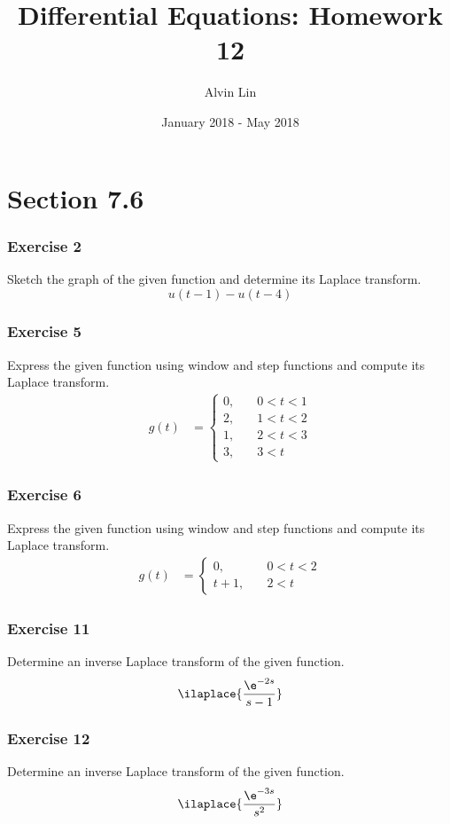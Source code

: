 \documentclass{math}
\title{Differential Equations: Homework 12}
\author{Alvin Lin}
\date{January 2018 - May 2018}
\begin{document}
\maketitle
\clearpage

\section*{Section 7.6}

\subsubsection*{Exercise 2}
Sketch the graph of the given function and determine its Laplace transform.
\[ u(t-1)-u(t-4) \]

\subsubsection*{Exercise 5}
Express the given function using window and step functions and compute its
Laplace transform.
\begin{align*}
  g(t) &= \begin{cases}
    0, &\quad 0<t<1 \\
    2, &\quad 1<t<2 \\
    1, &\quad 2<t<3 \\
    3, &\quad 3<t
  \end{cases}
\end{align*}

\subsubsection*{Exercise 6}
Express the given function using window and step functions and compute its
Laplace transform.
\begin{align*}
  g(t) &= \begin{cases}
    0, &\quad 0<t<2 \\
    t+1, &\quad 2<t
  \end{cases}
\end{align*}

\subsubsection*{Exercise 11}
Determine an inverse Laplace transform of the given function.
\begin{align*}
  \ilaplace{\frac{\e^{-2s}}{s-1}}
\end{align*}

\subsubsection*{Exercise 12}
Determine an inverse Laplace transform of the given function.
\begin{align*}
  \ilaplace{\frac{\e^{-3s}}{s^2}}
\end{align*}
\end{document}
